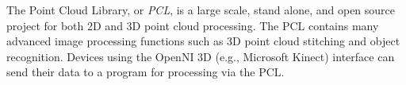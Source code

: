 The Point Cloud Library, or \emph{PCL}, is a large scale, stand alone, and open source project for both 2D and 3D point cloud processing. The PCL contains many advanced image processing functions such as 3D point cloud stitching and object recognition. Devices using the OpenNI 3D (e.g., Microsoft Kinect) interface can send their data to a program  for processing via the PCL.